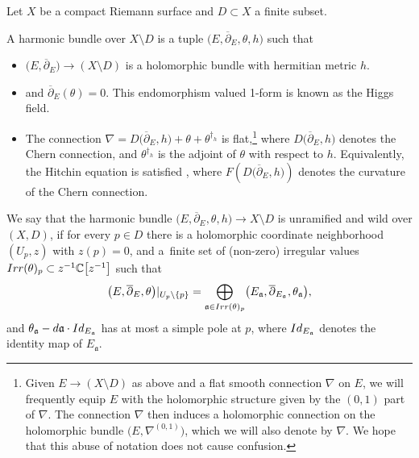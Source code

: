 \documentclass[11pt]{article}
\numberwithin{equation}{section}
\numberwithin{equation}{section}
\begin{document}
Let $X$ be a compact Riemann surface and $D\subset X$ a finite subset.
\begin{Definition} A harmonic bundle over $X\setminus D$ is a tuple $\bigl(E,\overline{\partial}_E,\theta,h\bigr)$ such that
\begin{itemize}\itemsep=0pt
 \item $\bigl(E,\overline{\partial}_E\bigr)\to (X\setminus D)$ is a holomorphic bundle with hermitian metric $h$.
 \item {} and $\overline{\partial}_E(\theta)=0$. This endomorphism valued 1-form is known as the Higgs field.
 \item The connection $\nabla = D\bigl(\overline{\partial}_E,h\bigr)+\theta + \theta^{\dagger_h}$ is flat,\footnote{Given $E\to (X\setminus D)$ as above and a flat smooth connection $\nabla$ on $E$, we will frequently equip $E$ with the holomorphic structure given by the $(0,1)$ part of $\nabla$. The connection $\nabla$ then induces a holomorphic connection on the holomorphic bundle $\bigl(E,\nabla^{(0,1)}\bigr)$, which we will also denote by $\nabla$. We hope that this abuse of notation does not cause confusion.} where $D\bigl(\overline{\partial}_E,h\bigr)$ denotes the Chern connection, and $\theta^{\dagger_h}$ is the adjoint of $\theta$ with respect to $h$. Equivalently, the Hitchin equation is satisfied
,
 where $F(D\bigl(\overline{\partial}_E,h\bigr))$ denotes the curvature of the Chern connection.
\end{itemize}

We say that the harmonic bundle $\bigl(E,\overline{\partial}_E,\theta,h\bigr) \to X\setminus D$ is unramified and wild over $(X,D)$,
 if for every $p\in D$ there is a holomorphic coordinate neighborhood $(U_p,z)$ with $z(p)=0$, and a~finite set of (non-zero) irregular values $\textnormal{Irr}(\theta)_p\subset z^{-1}\mathbb{C}\bigl[z^{-1}\bigr]$ such that
 \begin{equation*}
 \bigl(E,\overline{\partial}_E,\theta\bigr)|_{U_p\setminus \{p\}}=\bigoplus_{\mathfrak{a}\in \textnormal{Irr}(\theta)_p}\bigl(E_{\mathfrak{a}},\overline{\partial}_{E_{\mathfrak{a}}},\theta_{\mathfrak{a}}\bigr),
\end{equation*}
and $\theta_{\mathfrak{a}}-{\rm d}\mathfrak{a}\cdot \textnormal{Id}_{E_{\mathfrak{a}}}$ has at most a simple pole at $p$, where $\textnormal{Id}_{E_{\mathfrak{a}}}$ denotes the identity map of $E_{\mathfrak{a}}$.
\end{Definition}
\end{document}
